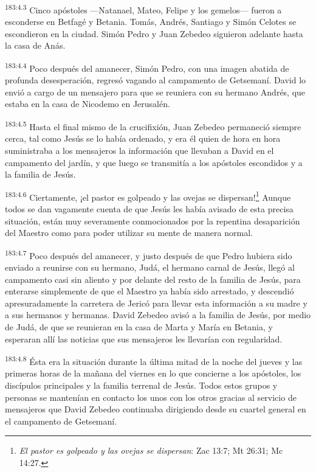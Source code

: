 \par 
\textsuperscript{183:4.3} Cinco apóstoles ---Natanael, Mateo, Felipe y los gemelos--- fueron a esconderse en Betfagé y Betania. Tomás, Andrés, Santiago y Simón Celotes se escondieron en la ciudad. Simón Pedro y Juan Zebedeo siguieron adelante hasta la casa de Anás.

\par 
\textsuperscript{183:4.4} Poco después del amanecer, Simón Pedro, con una imagen abatida de profunda desesperación, regresó vagando al campamento de Getsemaní. David lo envió a cargo de un mensajero para que se reuniera con su hermano Andrés, que estaba en la casa de Nicodemo en Jerusalén.

\par 
\textsuperscript{183:4.5} Hasta el final mismo de la crucifixión, Juan Zebedeo permaneció siempre cerca, tal como Jesús se lo había ordenado, y era él quien de hora en hora suministraba a los mensajeros la información que llevaban a David en el campamento del jardín, y que luego se transmitía a los apóstoles escondidos y a la familia de Jesús.

\par 
\textsuperscript{183:4.6} Ciertamente, ¡el pastor es golpeado y las ovejas se dispersan!\footnote{\textit{El pastor es golpeado y las ovejas se dispersan}: Zac 13:7; Mt 26:31; Mc 14:27.} Aunque todos se dan vagamente cuenta de que Jesús les había avisado de esta precisa situación, están muy severamente conmocionados por la repentina desaparición del Maestro como para poder utilizar su mente de manera normal.

\par 
\textsuperscript{183:4.7} Poco después del amanecer, y justo después de que Pedro hubiera sido enviado a reunirse con su hermano, Judá, el hermano carnal de Jesús, llegó al campamento casi sin aliento y por delante del resto de la familia de Jesús, para enterarse simplemente de que el Maestro ya había sido arrestado, y descendió apresuradamente la carretera de Jericó para llevar esta información a su madre y a sus hermanos y hermanas. David Zebedeo avisó a la familia de Jesús, por medio de Judá, de que se reunieran en la casa de Marta y María en Betania, y esperaran allí las noticias que sus mensajeros les llevarían con regularidad.

\par 
\textsuperscript{183:4.8} Ésta era la situación durante la última mitad de la noche del jueves y las primeras horas de la mañana del viernes en lo que concierne a los apóstoles, los discípulos principales y la familia terrenal de Jesús. Todos estos grupos y personas se mantenían en contacto los unos con los otros gracias al servicio de mensajeros que David Zebedeo continuaba dirigiendo desde su cuartel general en el campamento de Getsemaní.

